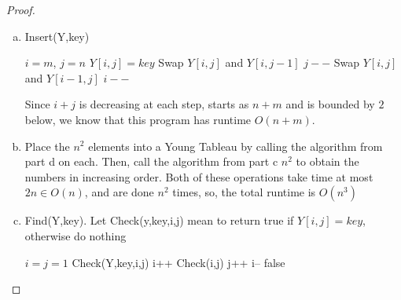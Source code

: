 \documentclass{article}
\begin{document}
\begin{proof}
\begin{enumerate}[a.]
\item
Insert(Y,key)
\begin{algorithm}
\begin{algorithmic}[1]
\State$i=m$, $j=n$
\State $Y[i,j] = key$
\State Swap $Y[i,j]$ and $Y[i,j-1]$
\State $j--$
\Else
\State Swap $Y[i,j]$ and $Y[i-1,j]$
\State $i--$
\EndIf
\EndWhile
\end{algorithmic}
\end{algorithm}
Since $i+j$ is decreasing at each step, starts as $n+m$ and is bounded by $2$ below, we know that this program has runtime $O(n+m)$.
\item
Place the $n^2$ elements into a Young Tableau by calling the algorithm from part d on each. Then, call the algorithm from part c $n^2$ to obtain the numbers in increasing order. Both of these operations take time at most $2n\in O(n)$, and are done $n^2$ times, so, the total runtime is $O(n^3)$
\item
Find(Y,key). Let Check(y,key,i,j) mean to return true if $Y[i,j]=key$, otherwise do nothing
\begin{algorithm}
\begin{algorithmic}
\State$ i =j= 1$
\State Check(Y,key,i,j)
\State i++
\EndWhile
{}
\State Check(i,j)
\State j++
\Else
\State i--
\EndIf
\EndWhile
\State \Return false
\end{algorithmic}
\end{algorithm}
\end{enumerate}
\end{proof}
\end{document}

